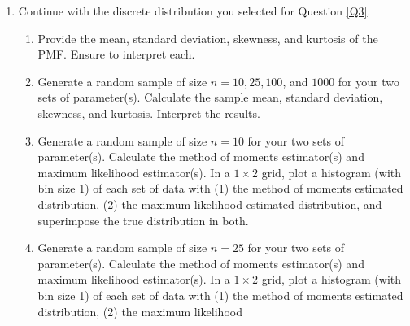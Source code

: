 \documentclass{article}\usepackage[]{graphicx}\usepackage[]{color}
\begin{document}
\begin{enumerate}
\item Continue with the discrete distribution you selected for Question \ref{Q3}.
\begin{enumerate}
  \item Provide the mean, standard deviation, skewness, and kurtosis of the PMF. 
  Ensure to interpret each.
  \item Generate a random sample of size $n=10, 25, 100$, and $1000$ for your 
  two sets of parameter(s). Calculate the sample mean, standard deviation, 
  skewness, and kurtosis. Interpret the results.
  \item Generate a random sample of size $n=10$ for your two sets of parameter(s).
  Calculate the method of moments estimator(s) and maximum likelihood estimator(s).
  In a $1 \times 2$ grid, plot a histogram (with bin size 1) of each set of data 
  with (1) the method of moments estimated distribution, (2) the maximum likelihood 
  estimated distribution, and superimpose the true distribution in both.
  \item Generate a random sample of size $n=25$ for your two sets of parameter(s). 
  Calculate the method of moments estimator(s) and maximum likelihood estimator(s).
  In a $1 \times 2$ grid, plot a histogram (with bin size 1) of each set of data 
  with (1) the method of moments estimated distribution, (2) the maximum likelihood 

\end{enumerate}
\end{enumerate}
\end{document}

